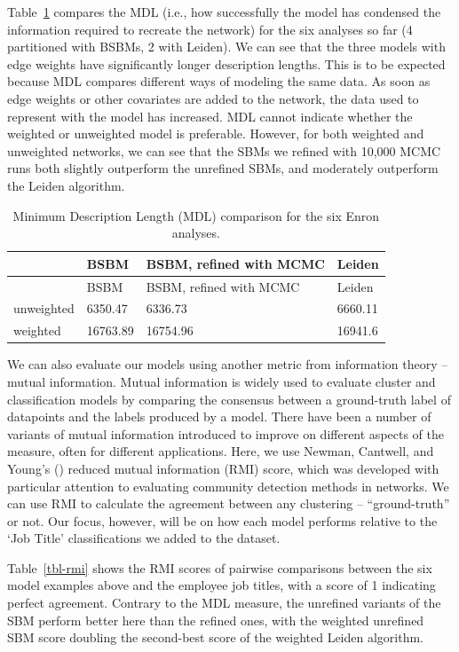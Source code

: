 \documentclass[
  12pt,
  a4paper,
  DIV=11,
  numbers=noendperiod,
  twoside,
  open=any]{scrartcl}
\begin{document}
Table~\ref{tbl-mdl} compares the MDL (i.e., how successfully the model
has condensed the information required to recreate the network) for the
six analyses so far (4 partitioned with BSBMs, 2 with Leiden). We can
see that the three models with edge weights have significantly longer
description lengths. This is to be expected because MDL compares
different ways of modeling the same data. As soon as edge weights or
other covariates are added to the network, the data used to represent
with the model has increased. MDL cannot indicate whether the weighted
or unweighted model is preferable. However, for both weighted and
unweighted networks, we can see that the SBMs we refined with 10,000
MCMC runs both slightly outperform the unrefined SBMs, and moderately
outperform the Leiden algorithm.

\begin{longtable}[]{@{}llll@{}}
\caption{Minimum Description Length (MDL) comparison for the six Enron
analyses.}\label{tbl-mdl}\tabularnewline
\toprule\noalign{}
& BSBM & BSBM, refined with MCMC & Leiden \\
\midrule\noalign{}
\endfirsthead
\toprule\noalign{}
& BSBM & BSBM, refined with MCMC & Leiden \\
\midrule\noalign{}
\endhead
\bottomrule\noalign{}
\endlastfoot
unweighted & 6350.47 & 6336.73 & 6660.11 \\
weighted & 16763.89 & 16754.96 & 16941.6 \\
\end{longtable}

We can also evaluate our models using another metric from information
theory -- mutual information. Mutual information is widely used to
evaluate cluster and classification models by comparing the consensus
between a ground-truth label of datapoints and the labels produced by a
model. There have been a number of variants of mutual information
introduced to improve on different aspects of the measure, often for
different applications. Here, we use Newman, Cantwell, and Young's
() reduced mutual information
(RMI) score, which was developed with particular attention to evaluating
community detection methods in networks. We can use RMI to calculate the
agreement between any clustering -- ``ground-truth'' or not. Our focus,
however, will be on how each model performs relative to the `Job Title'
classifications we added to the dataset.

Table~\ref{tbl-rmi} shows the RMI scores of pairwise comparisons between
the six model examples above and the employee job titles, with a score
of 1 indicating perfect agreement. Contrary to the MDL measure, the
unrefined variants of the SBM perform better here than the refined ones,
with the weighted unrefined SBM score doubling the second-best score of
the weighted Leiden algorithm.
\end{document}
